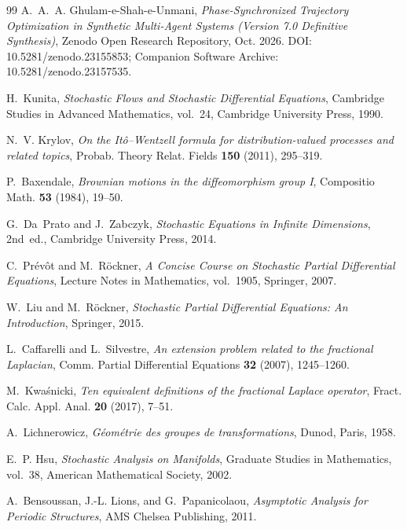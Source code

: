 \documentclass[11pt,a4paper,reqno]{article}
\def\texttt#1{#1}%
\def\zenodo#1{10.5281/zenodo.#1}%
\newcommand{\zenodo}[1]{\href{https://doi.org/10.5281/zenodo.#1}{\texttt{10.5281/\allowbreak zenodo.#1}}}
\theoremstyle{plain}
\theoremstyle{definition}
\theoremstyle{remark}
\numberwithin{equation}{section}
\begin{document}
\begin{thebibliography}{99}
A.~A.~A. Ghulam-e-Shah-e-Unmani,
\emph{Phase-Synchronized Trajectory Optimization in Synthetic Multi-Agent Systems (Version 7.0 Definitive Synthesis)},
Zenodo Open Research Repository, Oct. 2026.
\texttt{DOI:} \zenodo{23155853}; Companion Software Archive: \zenodo{23157535}.

H.~Kunita,
\emph{Stochastic Flows and Stochastic Differential Equations},
Cambridge Studies in Advanced Mathematics, vol.~24, Cambridge University Press, 1990.

N.~V. Krylov,
\emph{On the It\^o--Wentzell formula for distribution-valued processes and related topics},
Probab. Theory Relat. Fields \textbf{150} (2011), 295--319.

P.~Baxendale,
\emph{Brownian motions in the diffeomorphism group I},
Compositio Math. \textbf{53} (1984), 19--50.

G.~Da~Prato and J.~Zabczyk,
\emph{Stochastic Equations in Infinite Dimensions}, 2nd~ed.,
Cambridge University Press, 2014.

C.~Pr\'ev\^ot and M.~R\"ockner,
\emph{A Concise Course on Stochastic Partial Differential Equations},
Lecture Notes in Mathematics, vol.~1905, Springer, 2007.

W.~Liu and M.~R\"ockner,
\emph{Stochastic Partial Differential Equations: An Introduction},
Springer, 2015.

L.~Caffarelli and L.~Silvestre,
\emph{An extension problem related to the fractional Laplacian},
Comm. Partial Differential Equations \textbf{32} (2007), 1245--1260.

M.~Kwa\'snicki,
\emph{Ten equivalent definitions of the fractional Laplace operator},
Fract. Calc. Appl. Anal. \textbf{20} (2017), 7--51.

A.~Lichnerowicz,
\emph{G\'eom\'etrie des groupes de transformations},
Dunod, Paris, 1958.

E.~P. Hsu,
\emph{Stochastic Analysis on Manifolds},
Graduate Studies in Mathematics, vol.~38, American Mathematical Society, 2002.

A.~Bensoussan, J.-L. Lions, and G.~Papanicolaou,
\emph{Asymptotic Analysis for Periodic Structures},
AMS Chelsea Publishing, 2011.


\end{thebibliography}
\end{document}
